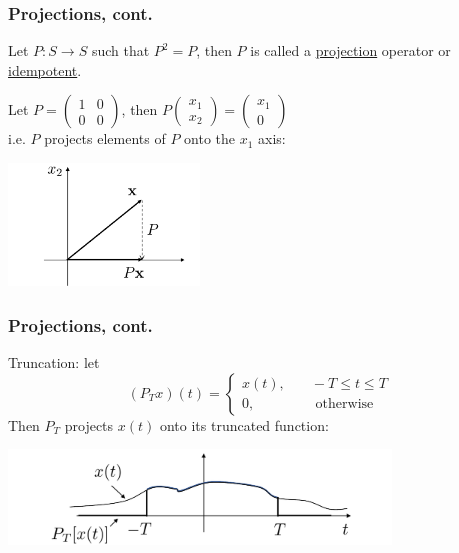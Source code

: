 \documentclass{beamer}
\begin{document}
\begin{frame}\frametitle{Projections, cont.}
\begin{definition} 
Let $P: S \to S$ such that $P^2 = P$,
then $P$ is called a \underline{projection} operator or \underline{idempotent}.	
\end{definition}

\begin{example}
Let $P = \left( \begin{array}{cc} 1 & 0
    \\ 0 & 0 \end{array} \right)$, then $P\left( \begin{array}{c} x_1
    \\ x_2 \end{array} \right) = \left( \begin{array}{c} x_1 \\
    0 \end{array} \right)$\\
i.e. $P$ projects elements of $P$ onto the $x_1$ axis:

\begin{center}
\includegraphics[width=2in]{figures/chap2_projection_1}
\end{center}

\end{example}
\end{frame}

\begin{frame}\frametitle{Projections, cont.}
\begin{example}
Truncation: let 
\[
(P_T x)(t) = \begin{cases} x(t), &\quad -T \leq t \leq T\\
0, &\quad \text{ otherwise }\end{cases}
\]
Then $P_T$ projects $x(t)$ onto its truncated function:\\

\begin{center}
\includegraphics[width=4in]{figures/chap2_projection_2}	
\end{center}
\end{example}
\end{frame}
\end{document}
